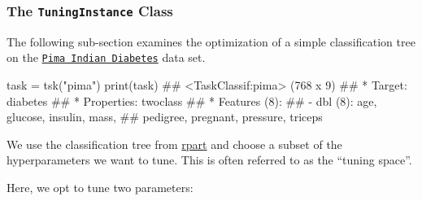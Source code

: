 \documentclass[]{article}
\newenvironment{Shaded}{}{}
\newcommand{\KeywordTok}[1]{\textcolor[rgb]{0.00,0.00,1.00}{#1}}
\newcommand{\NormalTok}[1]{#1}
\newcommand{\OperatorTok}[1]{#1}
\newcommand{\StringTok}[1]{\textcolor[rgb]{0.00,0.50,0.50}{#1}}
\renewenvironment{Shaded} {\begin{snugshade}\small} {\end{snugshade}}
\begin{document}
\hypertarget{tuning-optimization}{%
\subsubsection{\texorpdfstring{The \texttt{TuningInstance} Class}{The TuningInstance Class}}\label{tuning-optimization}}

The following sub-section examines the optimization of a simple classification tree on the \href{https://mlr3.mlr-org.com/reference/mlr_tasks_pima.html}{\texttt{Pima\ Indian\ Diabetes}} data set.

\begin{Shaded}
\begin{Highlighting}[]
\NormalTok{task =}\StringTok{ }\KeywordTok{tsk}\NormalTok{(}\StringTok{"pima"}\NormalTok{)}
\KeywordTok{print}\NormalTok{(task)}
\NormalTok{## <TaskClassif:pima> (768 x 9)}
\NormalTok{## * Target: diabetes}
\NormalTok{## * Properties: twoclass}
\NormalTok{## * Features (8):}
\NormalTok{##   - dbl (8): age, glucose, insulin, mass,}
\NormalTok{##     pedigree, pregnant, pressure, triceps}
\end{Highlighting}
\end{Shaded}

We use the classification tree from \href{https://cran.r-project.org/package=rpart}{rpart} and choose a subset of the hyperparameters we want to tune.
This is often referred to as the ``tuning space''.

\begin{Shaded}
\end{Shaded}

Here, we opt to tune two parameters:
\end{document}
